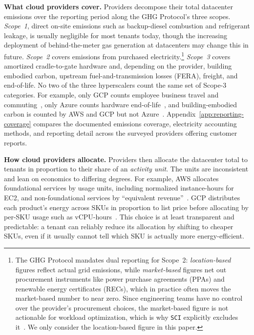 \documentclass[sigconf,screen,nonacm]{acmart}
\newcommand{\parag}[1]{\vspace{2mm}\noindent\textbf{#1.}\hspace{2mm}}
\newcommand{\SCI}{\texttt{SCI}\xspace}
\begin{document}
\parag{What cloud providers cover}
Providers decompose their total datacenter emissions over the reporting period along the GHG Protocol's three scopes.
\emph{Scope~1}, direct on-site emissions such as backup-diesel combustion and refrigerant leakage, is usually negligible for most tenants today, though the increasing deployment of behind-the-meter gas generation at datacenters may change this in future.
\emph{Scope~2} covers emissions from purchased electricity.\footnote{The GHG Protocol mandates dual reporting for Scope~2: \emph{location-based} figures reflect actual grid emissions, while \emph{market-based} figures net out procurement instruments like power purchase agreements (PPAs) and renewable energy certificates (RECs), which in practice often moves the market-based number to near zero. Since engineering teams have no control over the provider's procurement choices, the market-based figure is not actionable for workload optimization, which is why \SCI explicitly excludes it~\cite{sci-spec}. We only consider the location-based figure in this paper.}
\emph{Scope~3} covers amortized cradle-to-gate hardware and, depending on the provider, building embodied carbon, upstream fuel-and-transmission losses (FERA), freight, and end-of-life.
No two of the three hyperscalers count the same set of Scope-3 categories.
For example, only GCP counts employee business travel and commuting~\cite{google-carbon-methodology}, only Azure counts hardware end-of-life~\cite{microsoft-s3-2021}, and building-embodied carbon is counted by AWS and GCP but not Azure~\cite{aws-ccft-model3,google-carbon-methodology}.
Appendix~\ref{app:reporting-coverage} compares the documented emissions coverage, electricity accounting methods, and reporting detail across the surveyed providers offering customer reports.

\parag{How cloud providers allocate}
Providers then allocate the datacenter total to tenants in proportion to their share of an \emph{activity unit}.
The units are inconsistent and lean on economics to differing degrees.
For example, AWS allocates foundational services by usage units, including normalized instance-hours for EC2, and non-foundational services by ``equivalent revenue''~\cite{aws-ccft-model3}.
GCP distributes each product's energy across SKUs in proportion to list price before allocating by per-SKU usage such as vCPU-hours~\cite{schneider-mattia-2024}.
This choice is at least transparent and predictable: a tenant can reliably reduce its allocation by shifting to cheaper SKUs, even if it usually cannot tell which SKU is actually more energy-efficient.
\end{document}
